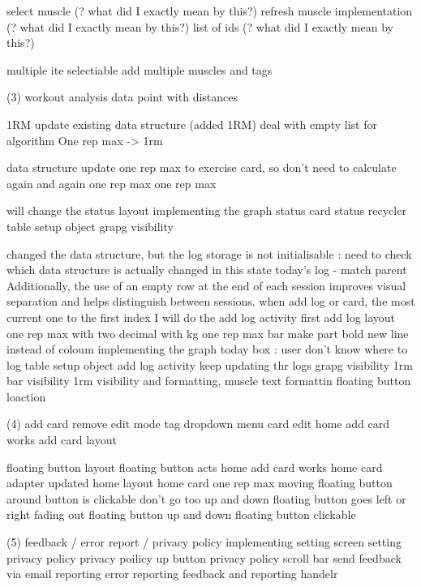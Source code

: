select muscle (? what did I exactly mean by this?)
refresh muscle implementation (? what did I exactly mean by this?)
list of ids (? what did I exactly mean by this?)

\addCardActivity
    multiple ite selectiable
    add multiple muscles and tags


(3) workout analysis 
\graph
data point with distances

\predicted 1RM
update existing data structure (added 1RM)
deal with empty list for algorithm
One rep max -> 1rm

data structure update
    \ExerciseCard
        one rep max to exercise card, so don't need to calculate again and again
    \ExerciseLog
        one rep max 
    \ExerciseSet
        one rep max

will change the status layout
implementing the graph
status card
status recycler
table setup object
grapg visibility


changed the data structure, but the log storage is not initialisable 
\todo : need to check which data structure is actually changed in this state
today's log - match parent
Additionally, the use of an empty row at the end of each session improves visual separation and helps distinguish between sessions.
when add log or card, the most current one to the first index
I will do the add log activity first
add log layout
one rep max with two decimal with kg
one rep max bar
make part bold
new line instead of coloum
implementing the graph
today box : user don't know where to log
table setup object
add log activity keep updating thr logs
grapg visibility
1rm bar visibility
1rm visibility and formatting, muscle text formattin
floating button loaction


(4) add card 
remove edit mode
tag dropdown menu
card edit
home add card works
add card layout

floating button layout 
floating button acts
home add card works
home card adapter updated
home layout
home card one rep max
moving floating button around
button is clickable
don't go too up and down
floating button goes left or right
fading out
floating button up and down
floating button clickable



(5) feedback / error report / privacy policy
implementing setting screen
setting privacy policy
privacy poilicy up button
privacy policy scroll bar
send feedback via email
reporting
error reporting
feedback and reporting handelr


